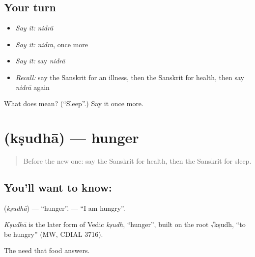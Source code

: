 \subsection*{Your turn}
\begin{itemize}
\raggedright
  \item \emph{Say it:} \emph{nidrā}
  \item \emph{Say it:} \emph{nidrā}, once more
  \item \emph{Say it:} say \emph{nidrā}
  \item \emph{Recall:} say the Sanskrit for an illness, then the Sanskrit for health, then say \emph{nidrā} again
\end{itemize}

\begin{tcolorbox}[breakable,colback=teal!4,colframe=teal!35!black,title={Before you move on}]
What does  mean? (\textquotedblleft{}Sleep\textquotedblright{}.) Say it once more.
\end{tcolorbox}
\section[\texorpdfstring{\sk{क्षुधा} (kṣudhā)}{क्षुधा (kṣudhā)}]{ (kṣudhā) — hunger}

\label{lesson:SA-C67-hunger}



\begin{quote}
Before the new one: say the Sanskrit for health, then the Sanskrit for sleep.
\end{quote}

\subsection*{You'll want to know: }
\textbf{} (\emph{kṣudhā}) — \textquotedblleft{}hunger\textquotedblright{}. \textbf{  } — \textquotedblleft{}I am hungry\textquotedblright{}.

\begin{cousinweb}
\emph{Kṣudhā} is the later form of Vedic \emph{kṣudh}, \textquotedblleft{}hunger\textquotedblright{}, built on the root √kṣudh, \textquotedblleft{}to be hungry\textquotedblright{} (MW, CDIAL 3716).
\end{cousinweb}

\begin{grammarlens}[title={What you've built}]
The need that food answers.
\end{grammarlens}

